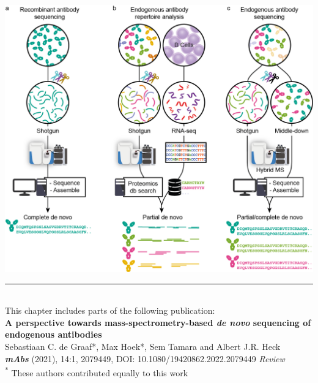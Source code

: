  \label{ch-1}

{
  \begin{center}
    \vspace*{0.5cm}
    \includegraphics[]{Chapter.1/Figures/ch1.png}
    \vspace{0.25cm}
  \end{center}
}

\begin{flushleft}
  \vspace*{\fill}
  \rule{\textwidth}{1pt}\\[0cm]
  This chapter includes parts of the following publication:\\
  \textbf{A perspective towards mass-spectrometry-based \emph{de novo} sequencing of endogenous antibodies}\\
  \footnotesize
  \vspace{0.3cm}
  Sebastiaan C. de Graaf*, Max Hoek*, Sem Tamara and Albert J.R. Heck \\
  \textbf{\emph{mAbs}} (2021), 14:1, 2079449, DOI: 10.1080/19420862.2022.2079449 \emph{Review}\\
  \vspace{0.3cm}
  \textsuperscript{*} These authors contributed equally to this work

\end{flushleft}
\newpage

\thumbforchapter


